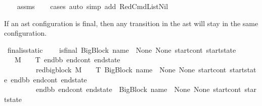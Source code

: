 \begin{isabellebody}
%
\isadelimproof
\ \ %
\endisadelimproof
%
\isatagproof
{}\isamarkupfalse%
\ assms\isanewline
\ \ \isamarkupfalse%
\ {\isacharparenleft}{\kern0pt}cases{\isacharparenright}{\kern0pt}\ {\isacharparenleft}{\kern0pt}auto\ simp\ add{\isacharcolon}{\kern0pt}\ RedCmdListNil{\isacharparenright}{\kern0pt}%
\endisatagproof
{\isafoldproof}%
%
\isadelimproof
%
\endisadelimproof
%
\begin{isamarkuptext}%
If an ast configuration is final, then any transition in the ast will stay in the same configuration.%
\end{isamarkuptext}\isamarkuptrue%
\isamarkupfalse%
\ final{\isacharunderscore}{\kern0pt}is{\isacharunderscore}{\kern0pt}static{\isacharcolon}{\kern0pt}\ \isanewline
\ \ \ {\isachardoublequoteopen}is{\isacharunderscore}{\kern0pt}final\ {\isacharparenleft}{\kern0pt}{\isacharparenleft}{\kern0pt}BigBlock\ name\ {\isacharbrackleft}{\kern0pt}{\isacharbrackright}{\kern0pt}\ None\ None{\isacharparenright}{\kern0pt}{\isacharcomma}{\kern0pt}\ start{\isacharunderscore}{\kern0pt}cont{\isacharcomma}{\kern0pt}\ start{\isacharunderscore}{\kern0pt}state{\isacharparenright}{\kern0pt}{\isachardoublequoteclose}\isanewline
\ \ \ {\isachardoublequoteopen}{\isasymAnd}M\ {\isasymLambda}\ {\isasymGamma}\ {\isasymOmega}\ T\ end{\isacharunderscore}{\kern0pt}bb\ end{\isacharunderscore}{\kern0pt}cont\ end{\isacharunderscore}{\kern0pt}state{\isachardot}{\kern0pt}\isanewline
\ \ \ \ \ \ \ \ \ {\isacharparenleft}{\kern0pt}red{\isacharunderscore}{\kern0pt}bigblock\ M\ {\isasymLambda}\ {\isasymGamma}\ {\isasymOmega}\ T\ {\isacharparenleft}{\kern0pt}{\isacharparenleft}{\kern0pt}BigBlock\ name\ {\isacharbrackleft}{\kern0pt}{\isacharbrackright}{\kern0pt}\ None\ None{\isacharparenright}{\kern0pt}{\isacharcomma}{\kern0pt}\ start{\isacharunderscore}{\kern0pt}cont{\isacharcomma}{\kern0pt}\ start{\isacharunderscore}{\kern0pt}state{\isacharparenright}{\kern0pt}\ {\isacharparenleft}{\kern0pt}end{\isacharunderscore}{\kern0pt}bb{\isacharcomma}{\kern0pt}\ end{\isacharunderscore}{\kern0pt}cont{\isacharcomma}{\kern0pt}\ end{\isacharunderscore}{\kern0pt}state{\isacharparenright}{\kern0pt}{\isacharparenright}{\kern0pt}\ {\isasymLongrightarrow}\ \isanewline
\ \ \ \ \ \ \ \ \ {\isacharparenleft}{\kern0pt}{\isacharparenleft}{\kern0pt}end{\isacharunderscore}{\kern0pt}bb{\isacharcomma}{\kern0pt}\ end{\isacharunderscore}{\kern0pt}cont{\isacharcomma}{\kern0pt}\ end{\isacharunderscore}{\kern0pt}state{\isacharparenright}{\kern0pt}\ {\isacharequal}{\kern0pt}\ {\isacharparenleft}{\kern0pt}{\isacharparenleft}{\kern0pt}BigBlock\ name\ {\isacharbrackleft}{\kern0pt}{\isacharbrackright}{\kern0pt}\ None\ None{\isacharparenright}{\kern0pt}{\isacharcomma}{\kern0pt}\ start{\isacharunderscore}{\kern0pt}cont{\isacharcomma}{\kern0pt}\ start{\isacharunderscore}{\kern0pt}state{\isacharparenright}{\kern0pt}{\isacharparenright}{\kern0pt}{\isachardoublequoteclose}\ \isanewline

\end{isabellebody}

